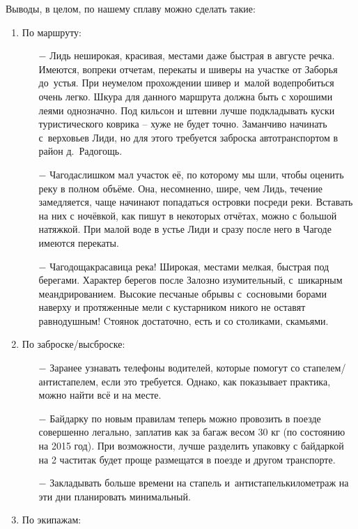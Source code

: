 Выводы, в целом, по нашему сплаву можно сделать такие:
\begin{enumerate}
	\setlength{\itemindent}{-1em}
	\item По маршруту:
	\begin{enumerate}
		\setlength{\itemindent}{0em}
		\item [$-$] Лидь неширокая, красивая, местами даже быстрая в августе речка. Имеются, вопреки отчетам, перекаты и шиверы на участке от Заборья до~устья. При неумелом прохождении шивер и~малой воде\mdash пробиться очень легко. Шкура для данного маршрута должна быть с хорошими леями однозначно. Под кильсон и штевни лучше подкладывать куски туристического коврика – хуже не будет точно. Заманчиво начинать с~верховьев Лиди, но для этого требуется заброска автотранспортом в район д.~Радогощь.
		\item [$-$] Чагода\mdash слишком мал участок её, по которому мы шли, чтобы оценить реку в полном объёме. Она, несомненно, шире, чем Лидь, течение замедляется, чаще начинают попадаться островки посреди реки. Вставать на них с ночёвкой, как пишут в некоторых отчётах, можно с большой натяжкой. При малой воде в устье Лиди и сразу после него в Чагоде имеются перекаты.
		\item [$-$] Чагодоща\mdash красавица река! Широкая, местами мелкая, быстрая под берегами. Характер берегов после Залозно изумительный, с~шикарным меандрированием. Высокие песчаные обрывы с~сосновыми борами наверху и протяженные мели с кустарником никого не оставят равнодушным! Cтоянок достаточно, есть и со столиками, скамьями.
	\end{enumerate}
	\item По заброске/высброске:
		\begin{enumerate}
		\setlength{\itemindent}{0em}
		\item [$-$] Заранее узнавать телефоны водителей, которые помогут со стапелем/антистапелем, если это требуется. Однако, как показывает практика, можно найти всё и на месте.
		\item [$-$] Байдарку по новым правилам теперь можно провозить в поезде совершенно легально, заплатив как за багаж весом 30 кг (по состоянию на 2015 год). При возможности, лучше разделить упаковку с байдаркой на 2 части\mdash так будет проще размещатся в поезде и другом транспорте.
		\item [$-$] Закладывать больше времени на стапель и~антистапель\mdash километраж на эти дни планировать минимальный.  
	\end{enumerate}
	\item По экипажам:

\end{enumerate}
